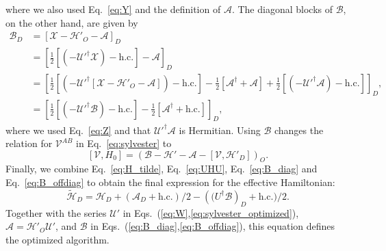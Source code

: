 %
where we also used Eq.~\eqref{eq:Y} and the definition of $\mathcal{A}$.
The diagonal blocks of $\mathcal{B}$, on the other hand, are given by
%
\begin{equation}
\label{eq:B_diag}
\begin{aligned}
  \mathcal{B}_D &= \left[\mathcal{X} - \mathcal{H}'_{O} - \mathcal{A}\right]_D \\
  &= \left[\frac{1}{2}[(-\mathcal{U}'^\dagger \mathcal{X})- \textrm{h.c.}] - \mathcal{A}\right]_D \\
  &= \left[\frac{1}{2}[(-\mathcal{U}'^\dagger [\mathcal{X} - \mathcal{H}'_{O} - \mathcal{A}])- \textrm{h.c.}] - \frac{1}{2}[\mathcal{A}^\dagger + \mathcal{A} ] + {\frac{1}{2}[( - \mathcal{U}'^\dagger\mathcal{A} ) - \textrm{h.c.}]}\right]_D, \\
  &= \left[\frac{1}{2}[(-\mathcal{U}'^\dagger \mathcal{B})- \textrm{h.c.}] - \frac{1}{2}[\mathcal{A}^\dagger + \textrm{h.c.} ]\right]_D,
\end{aligned}
\end{equation}
%
where we used Eq.~\eqref{eq:Z} and that $\mathcal{U}'^\dagger \mathcal{A}$ is Hermitian.
%
Using $\mathcal{B}$ changes the relation for $\mathcal{V}^{AB}$ in Eq.~\eqref{eq:sylvester} to
\begin{equation}
\label{eq:sylvester_optimized}
[\mathcal{V},H_0] = \left(\mathcal{B} - \mathcal{H}' - \mathcal{A} - [\mathcal{V}, \mathcal{H}'_{D}]\right)_{O}.
\end{equation}
Finally, we combine Eq.~\eqref{eq:H_tilde}, Eq.~\eqref{eq:UHU}, Eq.~\eqref{eq:B_diag} and Eq.~\eqref{eq:B_offdiag} to obtain the final expression for the effective Hamiltonian:
%
\begin{equation}
\label{eq:H_tilde_optimized}
\tilde{\mathcal{H}}_D = \mathcal{H}_D + (\mathcal{A}_D + \textrm{h.c.})/2 -(\mathcal({U}^\dagger \mathcal{B})_D + \textrm{h.c.})/2.
\end{equation}
Together with the series $\mathcal{U}'$ in Eqs.~(\ref{eq:W},\ref{eq:sylvester_optimized}), $\mathcal{A} = \mathcal{H}'_{O}\mathcal{U}'$, and $\mathcal{B}$ in Eqs.~(\ref{eq:B_diag},\ref{eq:B_offdiag}), this equation defines the optimized algorithm.
